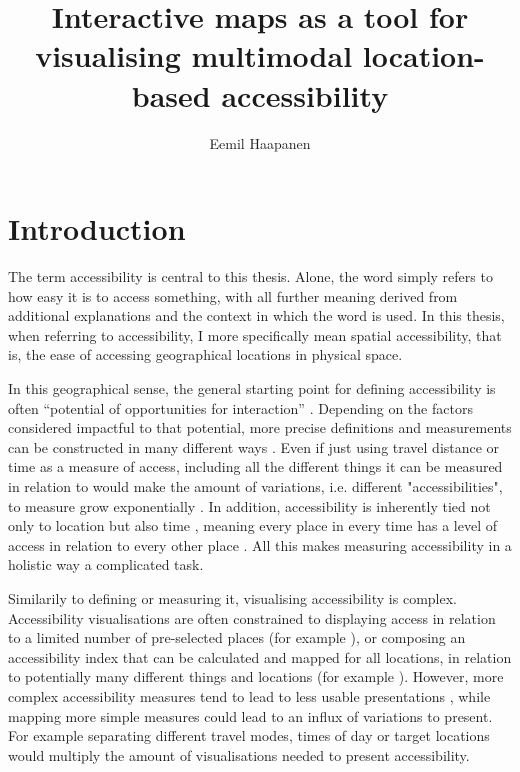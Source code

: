 \documentclass[12pt]{article}
\title{Interactive maps as a tool for visualising multimodal location-based accessibility}
\author{Eemil Haapanen}
\begin{document}
\maketitle

\section{Introduction}
The term accessibility is central to this thesis.
Alone, the word simply refers to how easy it is to access something,
with all further meaning derived from
additional explanations and the context in which the word is used.
In this thesis, when referring to accessibility,
I more specifically mean spatial accessibility,
that is, the ease of accessing geographical locations in physical space.

In this geographical sense,
the general starting point for defining accessibility is often
\enquote{potential of opportunities for interaction} \parencite{han1959}.  %
Depending on the factors considered impactful to that potential,
more precise definitions and measurements can be constructed in many different ways
\parencite{pap2016}.
Even if just using travel distance or time as a measure of access,
including all the different things it can be measured in relation to
would make the amount of variations, i.e. different "accessibilities",
to measure grow exponentially \parencite{lev2020}.
In addition, accessibility is inherently tied not only to location
but also time \parencite{jar2018},
meaning every place in every time has a level of access
in relation to every other place \parencite{lev2020}.
All this makes measuring accessibility in a holistic way a complicated task.

Similarily to defining or measuring it, visualising accessibility is complex.
Accessibility visualisations are often constrained to displaying access in relation to
a limited number of pre-selected places (for example \textcite{wei2018}),
or composing an accessibility index that can be calculated and mapped for all locations,
in relation to potentially many different things and locations (for example \textcite{kim2019}).
However, more complex accessibility measures tend to lead to
less usable presentations \parencite{te2014},
while mapping more simple measures could lead to an influx of variations to present.
For example separating different travel modes, times of day or target locations
would multiply the amount of visualisations needed to present accessibility.
\end{document}

